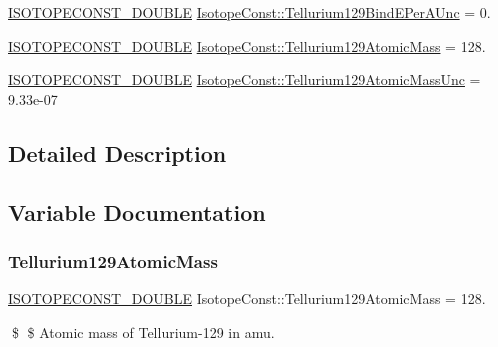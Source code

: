 \begin{DoxyCompactItemize}
\mbox{\hyperlink{group___isotope_const-_macros_ga8f45a7272ce02c0b4c65c44636ed719a}{I\+S\+O\+T\+O\+P\+E\+C\+O\+N\+S\+T\+\_\+\+D\+O\+U\+B\+LE}} \mbox{\hyperlink{group___isotope_const-_tellurium-_te129_gaab2f80939444509f33eb6001043f85b9}{Isotope\+Const\+::\+Tellurium129\+Bind\+E\+Per\+A\+Unc}} = 0.
\item 
\mbox{\hyperlink{group___isotope_const-_macros_ga8f45a7272ce02c0b4c65c44636ed719a}{I\+S\+O\+T\+O\+P\+E\+C\+O\+N\+S\+T\+\_\+\+D\+O\+U\+B\+LE}} \mbox{\hyperlink{group___isotope_const-_tellurium-_te129_ga909afd23d1833d428601fa34944aebbf}{Isotope\+Const\+::\+Tellurium129\+Atomic\+Mass}} = 128.
\item 
\mbox{\hyperlink{group___isotope_const-_macros_ga8f45a7272ce02c0b4c65c44636ed719a}{I\+S\+O\+T\+O\+P\+E\+C\+O\+N\+S\+T\+\_\+\+D\+O\+U\+B\+LE}} \mbox{\hyperlink{group___isotope_const-_tellurium-_te129_ga4d5f1e7d180a09899fdc619ce4a41d36}{Isotope\+Const\+::\+Tellurium129\+Atomic\+Mass\+Unc}} = 9.\+33e-\/07
\end{DoxyCompactItemize}


\subsection{Detailed Description}


\subsection{Variable Documentation}
\mbox{\label{group___isotope_const-_tellurium-_te129_ga909afd23d1833d428601fa34944aebbf}} 
\subsubsection{\texorpdfstring{Tellurium129\+Atomic\+Mass}{Tellurium129AtomicMass}}
{\footnotesize\ttfamily \mbox{\hyperlink{group___isotope_const-_macros_ga8f45a7272ce02c0b4c65c44636ed719a}{I\+S\+O\+T\+O\+P\+E\+C\+O\+N\+S\+T\+\_\+\+D\+O\+U\+B\+LE}} Isotope\+Const\+::\+Tellurium129\+Atomic\+Mass = 128.}

\$ \$ Atomic mass of Tellurium-\/129 in amu. \mbox{\label{group___isotope_const-_tellurium-_te129_ga4d5f1e7d180a09899fdc619ce4a41d36}} 
